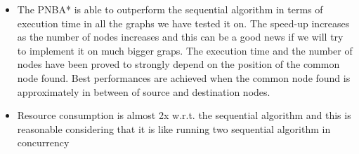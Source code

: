 \documentclass[twocolumn, switch]{article} %
\begin{document}
\begin{itemize}
  \item The PNBA* is able to outperform the sequential algorithm in terms of execution time in all the 
        graphs we have tested it on. The speed-up increases as the number of nodes increases and this can 
        be a good news if we will try to implement it on much bigger graps. The execution time and the number of
        nodes have been proved to strongly depend on the position of the common node found. Best performances
        are achieved when the common node found is approximately in between of source and destination nodes.
  \item Resource consumption is almost 2x w.r.t. the sequential algorithm and this is reasonable considering
        that it is like running two sequential algorithm in concurrency
\end{itemize}
\end{document}

